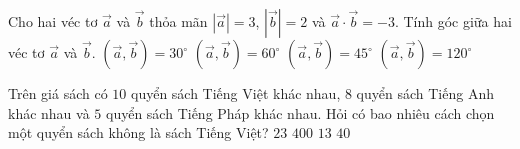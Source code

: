 \begin{ex}%
Cho hai véc tơ $\overrightarrow{a}$ và $\overrightarrow{b}$ thỏa mãn $\left|\overrightarrow{a}\right|=3$, $\left|\overrightarrow{b}\right|=2$ và $\overrightarrow{a}\cdot \overrightarrow{b}=-3$. Tính góc giữa hai véc tơ $\overrightarrow{a}$ và $\overrightarrow{b}$.
\choice
{$\left(\overrightarrow{a},\overrightarrow{b}\right)=30^{\circ}$}
{$\left(\overrightarrow{a},\overrightarrow{b}\right)=60^{\circ}$}
{$\left(\overrightarrow{a},\overrightarrow{b}\right)=45^{\circ}$}
{\True $\left(\overrightarrow{a},\overrightarrow{b}\right)=120^{\circ}$}
\end{ex}

\begin{ex}%
Trên giá sách có $10$ quyển sách Tiếng Việt khác nhau, $8$ quyển sách Tiếng Anh khác nhau và $5$ quyển sách Tiếng Pháp khác nhau. Hỏi có bao nhiêu cách chọn một quyển sách không là sách Tiếng Việt?
\choice
{$23$}
{$400$}
{\True $13$}
{$40$}
\end{ex}


